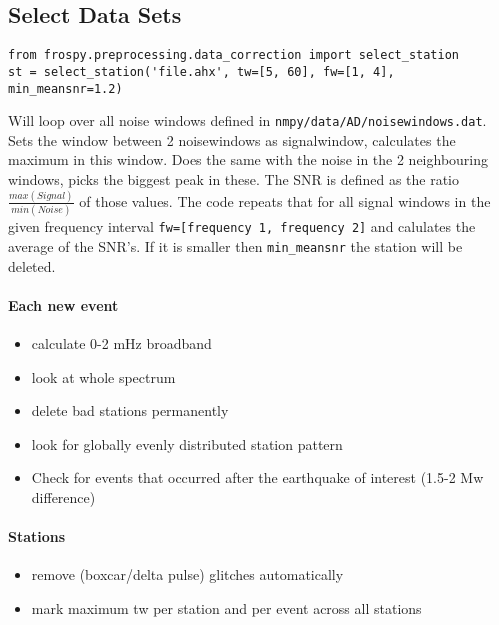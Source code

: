 \documentclass{article}
\begin{document}
\subsection{Select Data Sets}
\begin{lstlisting}
from frospy.preprocessing.data_correction import select_station
st = select_station('file.ahx', tw=[5, 60], fw=[1, 4], min_meansnr=1.2)
\end{lstlisting}
Will loop over all noise windows defined in
\lstinline[columns=fixed]{nmpy/data/AD/noisewindows.dat}. Sets the window
between 2 noisewindows as signalwindow, calculates the maximum in this window.
Does the same with the noise in the 2 neighbouring windows, picks the biggest
peak in these. The SNR is defined as the ratio $\frac{max(Signal)}{min(Noise)}$
of those values. The code repeats that for all signal windows in the given
frequency interval \lstinline[columns=fixed]{fw=[frequency 1, frequency 2]}
and calulates the average of the SNR's. If it is smaller then
\lstinline[]{min_meansnr} the station will be deleted.

\paragraph{Each new event}

\begin{itemize}
\item calculate 0-2 mHz broadband
\item look at whole spectrum
\item delete bad stations permanently
\item look for globally evenly distributed station pattern
\item Check for events that occurred after the earthquake of interest (1.5-2 Mw difference)
\end{itemize}

\paragraph{Stations}
\begin{itemize}
\item remove (boxcar/delta pulse) glitches automatically
\item mark maximum tw per station and per event across all stations
\end{itemize}
\end{document}
